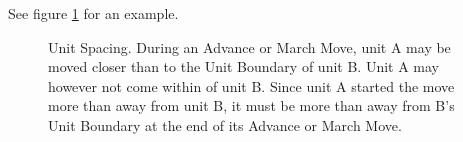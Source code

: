 See figure \ref{figure/unit_spacing} for an example.

\begin{figure}[!htbp]
	\begin{minipage}{0.45\textwidth}
	\def\svgwidth{\textwidth}
	
	\end{minipage}\hfill\begin{minipage}{0.52\textwidth}
	\caption{Unit Spacing.\captionpar
		During an Advance or March Move, unit A may be moved closer than  to the Unit Boundary of unit B. Unit A may however not come within  of unit B. Since unit A started the move more than  away from unit B, it must be more than  away from B's Unit Boundary at the end of its Advance or March Move.}
	\label{figure/unit_spacing}
	\end{minipage}
\end{figure}
